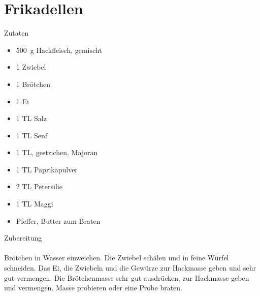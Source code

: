 \section*{Frikadellen}
\ihead{}\ohead{}
\cfoot{}
{\Large Zutaten}
\begin{multicols}{2}
\begin{itemize}
    \item \SI{500}{g} Hackfleisch, gemischt
    \item \num{1} Zwiebel
    \item \num{1} Brötchen
    \item \num{1} Ei
    \item \num{1} TL Salz
    \item \num{1} TL Senf
    \item \num{1} TL, gestrichen, Majoran
    \item \num{1} TL Paprikapulver
    \item \num{2} TL Petersilie
    \item \num{1} TL Maggi
    \item Pfeffer, Butter zum Braten
\end{itemize}
\end{multicols}
\noindent
{\Large Zubereitung}\\
\\
Brötchen in Wasser einweichen.
Die Zwiebel schälen und in feine Würfel schneiden.
Das Ei, die Zwiebeln und die Gewürze zur Hackmasse geben und sehr gut vermengen.
Die Brötchenmasse sehr gut ausdrücken, zur Hackmasse geben und vermengen.
Masse probieren oder eine Probe braten.
